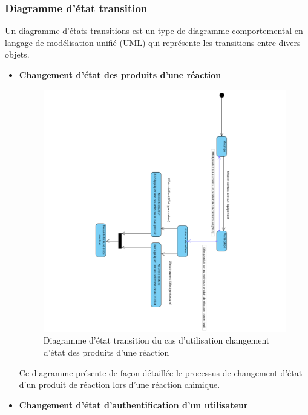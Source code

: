 \newpage
\subsubsection{Diagramme d’état transition}

Un diagramme d'états-transitions est un type de diagramme comportemental en langage de modélisation unifié (UML) qui représente les transitions entre divers objets.

\begin{itemize}
	\item \textbf{Changement d’état des produits d’une réaction}

	      \begin{figure}[H]
		      \centering
		      \includegraphics[width=1\textwidth]{img/etdR}
		      \caption{Diagramme d’état transition du cas d'utilisation changement d’état des produits d’une réaction}
		      \label{fig:mesh1}
	      \end{figure}

	      Ce diagramme présente de façon détaillée le processus de changement d’état d’un produit de réaction lors d’une réaction chimique.
	\newpage
	\item \textbf{Changement d’état d'authentification d’un utilisateur }


\end{itemize}
